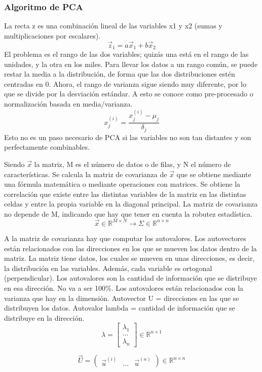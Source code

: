 \subsubsection{Algoritmo de PCA}
La recta z es una combinación lineal de las variables x1 y x2 (sumas y multiplicaciones por escalares). 
$$\vec{z}_1 = a\vec{x}_1 + b\vec{x}_2$$
El problema es el rango de las dos variables; quizás una está en el rango de las unidades, y la otra en los miles. Para llevar los datos a un rango común, se puede restar la media a la distribución, de forma que las dos distribuciones estén centradas en 0. Ahora, el rango de varianza sigue siendo muy diferente, por lo que se divide por la desviación estándar. A esto se conoce como pre-procesado o normalización basada en media/varianza. 
$$x_j^{(i)} = \frac{x_j^{(i)} - \mu_j}{\delta_j}$$
Esto no es un paso necesario de PCA si las variables no son tan distantes y son perfectamente combinables. 

Siendo $\vec{x}$ la matriz, M es el número de datos o de filas, y N el número de características. Se calcula la matriz de covarianza de $\vec{x}$ que se obtiene mediante una fórmula matemática o mediante operaciones con matrices. Se obtiene la correlación que existe entre las distintas variables de la matriz en las distintas celdas y entre la propia variable en la diagonal principal. La matriz de covarianza no depende de M, indicando que hay que tener en cuenta la robutez estadística.
$$\vec{x} \in \mathbb{R}^{M \times N} \rightarrow \Sigma \in \mathbb{R}^{n \times n}$$

A la matriz de covarianza hay que computar los autovalores. Los autovectores están relacionados con las direcciones en los que se mueven los datos dentro de la matriz. La matriz tiene datos, los cuales se mueven en unas direcciones, es decir, la distribución en las variables. Además, cada variable es ortogonal (perpendicular). Los autovalores son la cantidad de información que se distribuye en esa dirección. No va a ser 100\%. Los autovalores están relacionados con la varianza que hay en la dimensión. Autovector U = direcciones en las que se distribuyen los datos. Autovalor lambda = cantidad de información que se distribuye en la dirección. 
$$\lambda = \begin{bmatrix}
\lambda_1 \\ ... \\ \lambda_n
\end{bmatrix} \in \mathbb{R}^{n \times 1}$$

$$\vec{U} = \begin{pmatrix}
\vec{u}^{(i)} & ... & \vec{u}^{(n)}
\end{pmatrix} \in \mathbb{R}^{n \times n} $$

